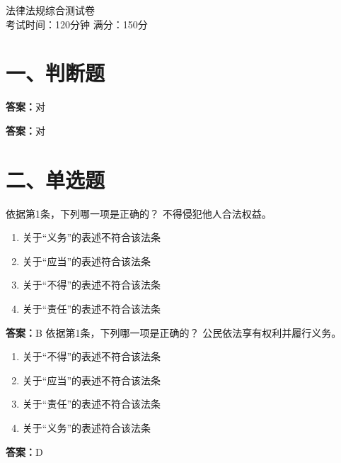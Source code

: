 \documentclass[12pt]{ctexart}
\begin{document}
\printanswers
\vspace*{-2em}
\begin{center}
  {\LARGE 法律法规综合测试卷}\\[4pt]
  考试时间：120分钟 \quad 满分：150分
\end{center}
\vspace{0.5em}

\section*{一、判断题}
\begin{questions}
\question {}\ifprintanswers\par\textbf{答案：}对\fi
\question {}\ifprintanswers\par\textbf{答案：}对\fi
\end{questions}
\section*{二、单选题}
\begin{questions}
\question 依据第1条，下列哪一项是正确的？
不得侵犯他人合法权益。
\begin{enumerate}[label=\Alph*.]
\item 关于“义务”的表述不符合该法条
\item 关于“应当”的表述符合该法条
\item 关于“不得”的表述不符合该法条
\item 关于“责任”的表述不符合该法条
\end{enumerate}
\ifprintanswers\par\textbf{答案：}B\fi
\question 依据第1条，下列哪一项是正确的？
公民依法享有权利并履行义务。
\begin{enumerate}[label=\Alph*.]
\item 关于“不得”的表述不符合该法条
\item 关于“应当”的表述不符合该法条
\item 关于“责任”的表述不符合该法条
\item 关于“义务”的表述符合该法条
\end{enumerate}
\ifprintanswers\par\textbf{答案：}D\fi
\end{questions}
\end{document}
